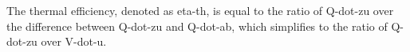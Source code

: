The thermal efficiency, denoted as eta-th, is equal to the ratio of Q-dot-zu over the difference between Q-dot-zu and Q-dot-ab, which simplifies to the ratio of Q-dot-zu over V-dot-u.